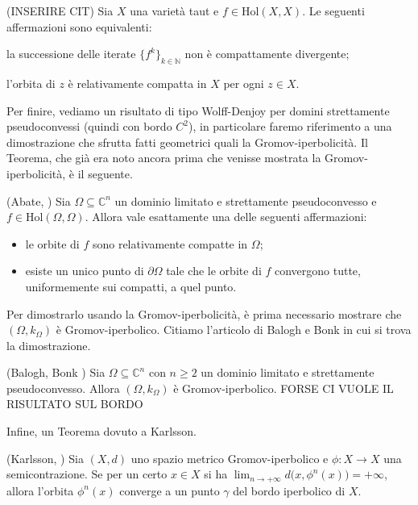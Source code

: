 \begin{thm}
    (INSERIRE CIT) Sia $X$ una varietà taut e $f \in \text{Hol}(X,X)$. Le seguenti affermazioni sono equivalenti:
    \begin{nlist}
        \item la successione delle iterate $\{f^k\}_{k \in \mathbb{N}}$ non è compattamente divergente;
        \item l'orbita di $z$ è relativamente compatta in $X$ per ogni $z \in X$.
    \end{nlist}
\end{thm}

Per finire, vediamo un risultato di tipo Wolff-Denjoy per domini strettamente pseudoconvessi (quindi con bordo $C^2$), in particolare faremo riferimento a una dimostrazione che sfrutta fatti geometrici quali la Gromov-iperbolicità. Il Teorema, che già era noto ancora prima che venisse mostrata la Gromov-iperbolicità, è il seguente.

\begin{thm} \label{abate_wd}
    (Abate, \cite[Theorem 0.5]{A}) Sia $\Omega \subseteq \mathbb{C}^n$ un dominio limitato e strettamente pseudoconvesso e $f \in \text{Hol}(\Omega,\Omega)$. Allora vale esattamente una delle seguenti affermazioni:
    \begin{itemize}
        \item le orbite di $f$ sono relativamente compatte in $\Omega$;
        \item esiste un unico punto di $\partial\Omega$ tale che le orbite di $f$ convergono tutte, uniformemente sui compatti, a quel punto.
    \end{itemize}
\end{thm}

Per dimostrarlo usando la Gromov-iperbolicità, è prima necessario mostrare che $(\Omega,k_{\Omega})$ è Gromov-iperbolico. Citiamo l'articolo di Balogh e Bonk in cui si trova la dimostrazione.

\begin{thm} \label{balogh_bonk}
    (Balogh, Bonk \cite[Theorem 1.4]{BB}) Sia $\Omega \subseteq \mathbb{C}^n$ con $n \ge 2$ un dominio limitato e strettamente pseudoconvesso. Allora $(\Omega,k_{\Omega})$ è Gromov-iperbolico. FORSE CI VUOLE IL RISULTATO SUL BORDO
\end{thm}

Infine, un Teorema dovuto a Karlsson.

\begin{thm} \label{karlsson}
    (Karlsson, \cite[Proposition 5.1]{Ka}) Sia $(X,d)$ uno spazio metrico Gromov-iperbolico e $\phi:X \longrightarrow X$ una semicontrazione. Se per un certo $x \in X$ si ha $\displaystyle\lim_{n\longrightarrow+\infty}d\big(x,\phi^n(x)\big)=+\infty$, allora l'orbita $\phi^n(x)$ converge a un punto $\gamma$ del bordo iperbolico di $X$.
\end{thm}

